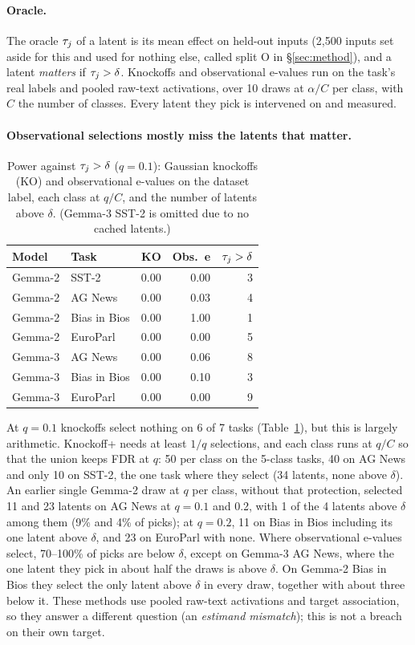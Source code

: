 \paragraph{Oracle.} The oracle $\tau_j$ of a latent is its mean effect on held-out inputs (2,500 inputs set aside for this and used for nothing else, called split O in \S\ref{sec:method}), and a latent \emph{matters} if $\tau_j > \delta$. Knockoffs and observational e-values run on the
task's real labels and pooled raw-text activations, over 10 draws at $\alpha/C$ per class, with $C$ the number of
classes. Every latent they pick is intervened on and measured.

\paragraph{Observational selections mostly miss the latents that matter.}

\begin{table}[t]
\centering
\small
\setlength{\tabcolsep}{3pt}
\begin{tabular}{llrrr}
\toprule
Model & Task & KO & Obs.\ e & $\tau_j > \delta$ \\
\midrule
Gemma-2 & SST-2 & 0.00 & 0.00 & 3 \\
Gemma-2 & AG News & 0.00 & 0.03 & 4 \\
Gemma-2 & Bias in Bios & 0.00 & 1.00 & 1 \\
Gemma-2 & EuroParl & 0.00 & 0.00 & 5 \\
Gemma-3 & AG News & 0.00 & 0.06 & 8 \\
Gemma-3 & Bias in Bios & 0.00 & 0.10 & 3 \\
Gemma-3 & EuroParl & 0.00 & 0.00 & 9 \\
\bottomrule
\end{tabular}
\caption{Power against $\tau_j > \delta$ ($q = 0.1$): Gaussian knockoffs (KO) and observational e-values
on the dataset label, each class at $q/C$, and the number of latents above $\delta$. (Gemma-3 SST-2 is omitted due to no cached latents.)}
\label{tab:baselines}
\end{table}

At $q = 0.1$ knockoffs select nothing on 6 of 7 tasks (Table~\ref{tab:baselines}), but this is largely arithmetic. Knockoff+
needs at least $1/q$ selections, and each class runs at $q/C$ so that the union keeps FDR at $q$: 50 per class on the 5-class
tasks, 40 on AG News and only 10 on SST-2, the one task where they select (34 latents, none above $\delta$). An earlier
single Gemma-2 draw at $q$ per class, without that protection, selected 11 and 23 latents on AG News at $q = 0.1$ and 0.2, with 1 of
the 4 latents above $\delta$ among them (9\% and 4\% of picks); at $q = 0.2$, 11 on Bias in Bios including its one latent above $\delta$, and 23 on EuroParl with none. Where observational e-values select, 70--100\% of picks are below $\delta$,
except on Gemma-3 AG News, where the one latent they pick in about half the draws is above $\delta$.
On Gemma-2 Bias in Bios they select the only latent above $\delta$ in every draw, together with about three below it.
These methods use pooled raw-text activations and target association, so they answer a different question (an \emph{estimand mismatch});
this is not a breach on their own target.

